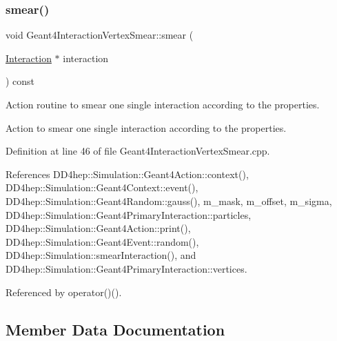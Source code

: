 \hypertarget{class_d_d4hep_1_1_simulation_1_1_geant4_interaction_vertex_smear_af1ff8068afb57e4b3874d2073ddc0d07}{}\label{class_d_d4hep_1_1_simulation_1_1_geant4_interaction_vertex_smear_af1ff8068afb57e4b3874d2073ddc0d07} 
\subsubsection{\texorpdfstring{smear()}{smear()}}
{\footnotesize\ttfamily void Geant4\+Interaction\+Vertex\+Smear\+::smear (\begin{DoxyParamCaption}\item[{\hyperlink{class_d_d4hep_1_1_simulation_1_1_geant4_interaction_vertex_smear_ab70397967639759170996f67855a8c74}{Interaction} $\ast$}]{interaction }\end{DoxyParamCaption}) const\hspace{0.3cm}{\ttfamily [protected]}}



Action routine to smear one single interaction according to the properties. 

Action to smear one single interaction according to the properties. 

Definition at line 46 of file Geant4\+Interaction\+Vertex\+Smear.\+cpp.



References D\+D4hep\+::\+Simulation\+::\+Geant4\+Action\+::context(), D\+D4hep\+::\+Simulation\+::\+Geant4\+Context\+::event(), D\+D4hep\+::\+Simulation\+::\+Geant4\+Random\+::gauss(), m\+\_\+mask, m\+\_\+offset, m\+\_\+sigma, D\+D4hep\+::\+Simulation\+::\+Geant4\+Primary\+Interaction\+::particles, D\+D4hep\+::\+Simulation\+::\+Geant4\+Action\+::print(), D\+D4hep\+::\+Simulation\+::\+Geant4\+Event\+::random(), D\+D4hep\+::\+Simulation\+::smear\+Interaction(), and D\+D4hep\+::\+Simulation\+::\+Geant4\+Primary\+Interaction\+::vertices.



Referenced by operator()().



\subsection{Member Data Documentation}
\hypertarget{class_d_d4hep_1_1_simulation_1_1_geant4_interaction_vertex_smear_a1862cd4719c77831e20725e7228bd6f1}{}\label{class_d_d4hep_1_1_simulation_1_1_geant4_interaction_vertex_smear_a1862cd4719c77831e20725e7228bd6f1} 
